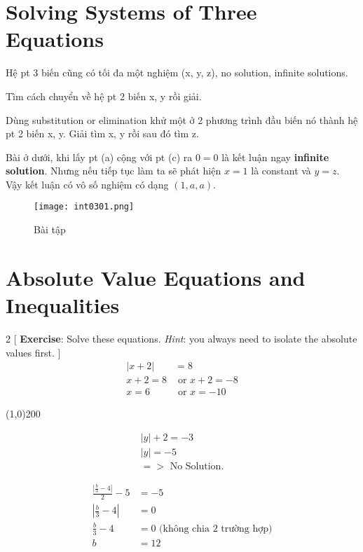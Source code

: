 \section{Solving Systems of Three Equations}

Hệ pt 3 biến cũng có tối đa một nghiệm (x, y, z), no solution, infinite solutions.

Tìm cách chuyển về hệ pt 2 biến x, y rồi giải.

Dùng substitution or elimination khử một ở 2 phương trình đầu biến nó thành hệ pt 2 biến x, y. Giải tìm x, y rồi sau đó tìm z.

\vspace{.4cm}

Bài ở dưới, khi lấy pt (a) cộng với pt (c) ra $0=0$ là kết luận ngay \textbf{infinite solution}. Nhưng nếu tiếp tục làm ta sẽ phát hiện $x=1$ là constant và $y=z$. Vậy kết luận có vô số nghiệm có dạng $(1, a, a)$.

\begin{figure}[htb!]
  \centering
  \texttt{[image: int0301.png]}
  \caption{Bài tập}
\end{figure}

\section{Absolute Value Equations and Inequalities}

\begin{multicols}{2}
[
  \textbf{Exercise}: Solve these equations. \textit{Hint}: you always need to isolate the absolute values first.
]
\begin{equation*}
\begin{split}
  |x+2| &= 8 \\
  x+2=8 &\text{ or } x+2=-8\\
  x=6 &\text{ or } x=-10
\end{split}
\end{equation*}

\begin{center} \line(1,0){200} \end{center}

\begin{align*} 
|y|+2=-3\\
|y| = -5\\
  =>\text{ No Solution.}
\end{align*}

\begin{align*} 
  \frac{\left| \frac{b}{3}-4 \right|}{2} -5 &=-5\\
  \left| \frac{b}{3}-4 \right| &= 0 \\
  \frac{b}{3}-4 &=0 \text{ (không chia 2 trường hợp)}\\
  b&=12
\end{align*}

\end{multicols}

